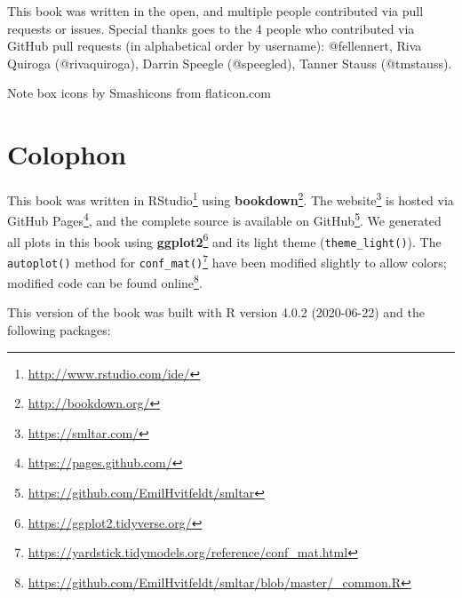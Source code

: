 \documentclass[
]{krantz}
\DeclareRobustCommand{\href}[2]{#2\footnote{\url{#1}}}
\renewcommand{\href}[2]{#2\footnote{\url{#1}}}
\begin{document}
This book was written in the open, and multiple people contributed via pull requests or issues. Special thanks goes to the 4 people who contributed via GitHub pull requests (in alphabetical order by username): @fellennert, Riva Quiroga (@rivaquiroga), Darrin Speegle (@speegled), Tanner Stauss (@tmstauss).

Note box icons by Smashicons from flaticon.com

\hypertarget{colophon}{%
\section*{Colophon}\label{colophon}}


This book was written in \href{http://www.rstudio.com/ide/}{RStudio} using \href{http://bookdown.org/}{\textbf{bookdown}}. The \href{https://smltar.com/}{website} is hosted via \href{https://pages.github.com/}{GitHub Pages}, and the complete source is available on \href{https://github.com/EmilHvitfeldt/smltar}{GitHub}. We generated all plots in this book using \href{https://ggplot2.tidyverse.org/}{\textbf{ggplot2}} and its light theme (\texttt{theme\_light()}). The \texttt{autoplot()} method for \href{https://yardstick.tidymodels.org/reference/conf_mat.html}{\texttt{conf\_mat()}} have been modified slightly to allow colors; modified code can be found \href{https://github.com/EmilHvitfeldt/smltar/blob/master/_common.R}{online}.

This version of the book was built with R version 4.0.2 (2020-06-22) and the following packages:
\end{document}
